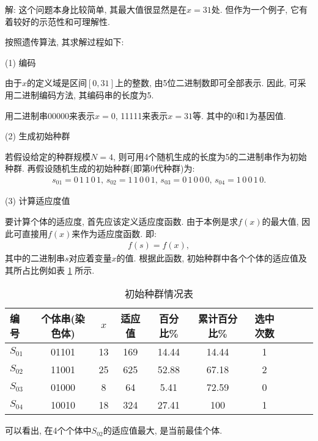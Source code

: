 解: 这个问题本身比较简单, 其最大值很显然是在$x=31$处. 但作为一个例子, 它有着较好的示范性和可理解性.

按照遗传算法, 其求解过程如下:

    (1) 编码

    由于$x$的定义域是区间$[0,31]$上的整数, 由5位二进制数即可全部表示. 因此, 可采用二进制编码方法, 其编码串的长度为5.

    \begin{example}
        用二进制串00000来表示$x=0$, 11111来表示$x=31$等. 其中的0和1为基因值.
    \end{example}

    (2) 生成初始种群

    若假设给定的种群规模$N=4$, 则可用4个随机生成的长度为5的二进制串作为初始种群. 再假设随机生成的初始种群(即第0代种群)为:
\begin{align*}
  s_{01}=0\,  1\,  1\,  0\,  1,\, s_{02}=1\,  1\,  0\,  0\,  1,\,  s_{03}=0\,  1\,  0\,  0\,  0,\,  s_{04}=1\,  0\,  0\,  1\,  0.
\end{align*}

 (3) 计算适应度值

要计算个体的适应度, 首先应该定义适应度函数. 由于本例是求$f(x)$的最大值, 因此可直接用$f(x)$来作为适应度函数. 即:
\begin{align*}
    f(s)=f(x),
\end{align*}
其中的二进制串$s$对应着变量$x$的值. 根据此函数, 初始种群中各个个体的适应值及其所占比例如表 \ref{AI_table2019112802} 所示.
\begin{table}[H]
\caption{初始种群情况表}
\vspace{-0.6cm}
\begin{center}
\begin{tabular} {lccccccccc}
  \hline
编号&个体串(染色体)&	$x$	&适应值&	百分比\%&	累计百分比\%&	选中次数\\
\hline
$S_{01}$&     01101&	13&	169&	14.44&	14.44&	1\\
$S_{02}$&	11001&	25&	625&	52.88&	67.18&	2\\
$S_{03}$&	01000&	8&	64&	5.41&	72.59&	0\\
$S_{04}$&	10010&	18&	324&	27.41&	100&	1\\
\hline
\end{tabular}
\end{center}
\label{AI_table2019112802}\vspace{-0.4cm}
\end{table}
可以看出, 在4个个体中$S_{02}$的适应值最大, 是当前最佳个体.

